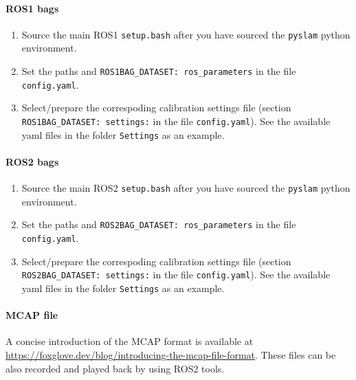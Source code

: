 \documentclass{article}
\providecommand{\tightlist}{%
  \setlength{\itemsep}{0pt}\setlength{\parskip}{0pt}}
\let\oldparagraph\paragraph
\renewcommand{\paragraph}[1]{\oldparagraph{#1}\mbox{}}
\begin{document}
\hypertarget{ros1-bags}{%
\paragraph{ROS1 bags}\label{ros1-bags}}

\begin{enumerate}
\def\labelenumi{\arabic{enumi}.}
\tightlist
\item
  Source the main ROS1 \texttt{setup.bash} after you have sourced the
  \texttt{pyslam} python environment.
\item
  Set the paths and \texttt{ROS1BAG\_DATASET:\ ros\_parameters} in the
  file \texttt{config.yaml}.
\item
  Select/prepare the correspoding calibration settings file (section
  \texttt{ROS1BAG\_DATASET:\ settings:} in the file
  \texttt{config.yaml}). See the available yaml files in the folder
  \texttt{Settings} as an example.
\end{enumerate}

\hypertarget{ros2-bags}{%
\paragraph{ROS2 bags}\label{ros2-bags}}

\begin{enumerate}
\def\labelenumi{\arabic{enumi}.}
\tightlist
\item
  Source the main ROS2 \texttt{setup.bash} after you have sourced the
  \texttt{pyslam} python environment.
\item
  Set the paths and \texttt{ROS2BAG\_DATASET:\ ros\_parameters} in the
  file \texttt{config.yaml}.
\item
  Select/prepare the correspoding calibration settings file (section
  \texttt{ROS2BAG\_DATASET:\ settings:} in the file
  \texttt{config.yaml}). See the available yaml files in the folder
  \texttt{Settings} as an example.
\end{enumerate}


\hypertarget{mcap-file}{%
\paragraph{MCAP file}\label{mcap-file}}

A concise introduction of the MCAP format is available at \href{https://foxglove.dev/blog/introducing-the-mcap-file-format}{https://foxglove.dev/blog/introducing-the-mcap-file-format}. These files can be also recorded and played back by using ROS2 tools.  
\end{document}

